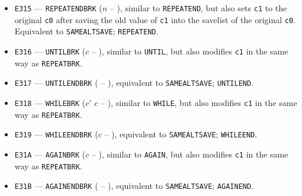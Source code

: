\documentclass[12pt,oneside]{article}
\begin{document}
\begin{itemize}
\item {\tt E315} --- {\tt REPEATENDBRK} ($n$ -- ), similar to {\tt REPEATEND}, but also sets {\tt c1} to the original {\tt c0} after saving the old value of {\tt c1} into the savelist of the original {\tt c0}. Equivalent to {\tt SAMEALTSAVE}; {\tt REPEATEND}.
\item {\tt E316} --- {\tt UNTILBRK} ($c$ -- ), similar to {\tt UNTIL}, but also modifies {\tt c1} in the same way as {\tt REPEATBRK}.
\item {\tt E317} --- {\tt UNTILENDBRK} ( -- ), equivalent to {\tt SAMEALTSAVE}; {\tt UNTILEND}.
\item {\tt E318} --- {\tt WHILEBRK} ($c'$ $c$ -- ), similar to {\tt WHILE}, but also modifies {\tt c1} in the same way as {\tt REPEATBRK}.
\item {\tt E319} --- {\tt WHILEENDBRK} ($c$ -- ), equivalent to {\tt SAMEALTSAVE}; {\tt WHILEEND}.
\item {\tt E31A} --- {\tt AGAINBRK} ($c$ -- ), similar to {\tt AGAIN}, but also modifies {\tt c1} in the same way as {\tt REPEATBRK}.
\item {\tt E31B} --- {\tt AGAINENDBRK} ( -- ), equivalent to {\tt SAMEALTSAVE}; {\tt AGAINEND}.
\end{itemize}
\end{document}
